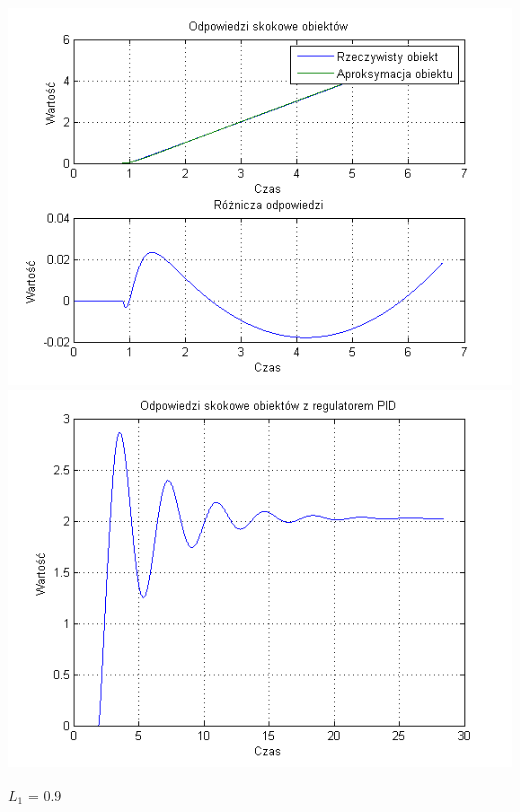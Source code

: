 \documentclass[10pt,a4paper]{article}
\begin{document}
\begin{center}
\includegraphics[scale=1]{images/dwa/skrypt_149.png}\\
\includegraphics[scale=1]{images/dwa/skrypt_150.png}\\
\end{center}
\newpage
$L_1$ = 0.9
\end{document}
